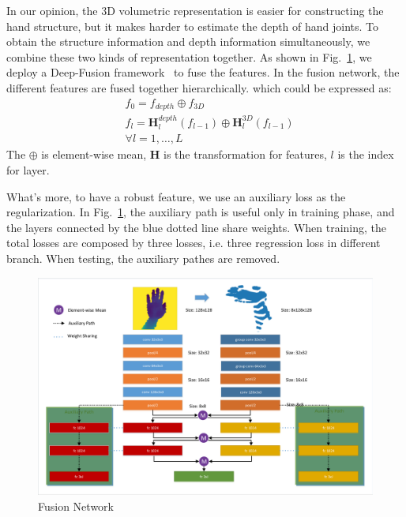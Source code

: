\documentclass[journal,comsoc]{IEEEtran}
\let\MYoriglatexcaption\caption
\renewcommand{\caption}[2][\relax]{\MYoriglatexcaption[#2]{#2}}
\begin{document}
In our opinion, the 3D volumetric representation is easier for constructing the hand structure, but it makes harder to estimate
the depth of hand joints. To obtain the structure information and depth information simultaneously, we combine these two kinds
of representation together. As shown in Fig.~\ref{fig:fusion network}, we deploy a Deep-Fusion framework~\cite{chen2016multi} to fuse
the features. In the fusion network, the different features are fused together hierarchically. which could be expressed as:
\begin{equation}\label{eq:deep fusion}
\begin{aligned}
&f_0 = f_{depth} \oplus f_{3D} \\
&f_l = \textbf{H}_l^{depth}(f_{l-1}) \oplus \textbf{H}_l^{3D}(f_{l-1}) \\
&\forall l=1, \dots , L
\end{aligned}
\end{equation}
The $\oplus$ is element-wise mean, $\textbf{H}$ is the transformation for features, $l$ is the index for layer.

What's more, to have a robust feature, we use an auxiliary loss as the regularization. In Fig.~\ref{fig:fusion network},
the auxiliary path is useful only in training phase, and the layers connected by the blue dotted line share weights.
When training, the total losses are composed by three losses, i.e. three regression loss in different branch.
When testing, the auxiliary pathes are removed.
\begin{figure}[t]
    \centering
    \includegraphics[width=1\linewidth]{src/network/fusion.pdf}
    \caption{Fusion Network}
\label{fig:fusion network}
\end{figure}
\end{document}
